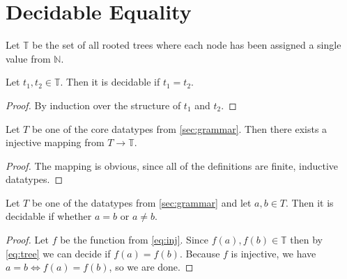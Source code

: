 \section{Decidable Equality}

\begin{definition}
  Let $\mathbb{T}$ be the set of all rooted trees where each node has been
  assigned a single value from $\mathbb{N}$.
\end{definition}

\begin{lemma}
  Let $t_1, t_2 \in \mathbb{T}$. Then it is decidable if $t_1 = t_2$.
\end{lemma}
\label{eq:tree}
\begin{proof}
  By induction over the structure of $t_1$ and $t_2$.
\end{proof}

\begin{lemma}
  Let $T$ be one of the core datatypes from \autoref{sec:grammar}. Then there
  exists a injective mapping from $T \to \mathbb{T}$.
\end{lemma}
\label{eq:inj}
\begin{proof}
  The mapping is obvious, since all of the definitions are finite, inductive
  datatypes.
\end{proof}

\begin{corollary}
  Let $T$ be one of the datatypes from \autoref{sec:grammar} and let
  $a, b \in T$. Then it is decidable if whether $a=b$ or $a \neq b$.
\end{corollary}
\label{dec:eq}
\begin{proof}
  Let $f$ be the function from \autoref{eq:inj}. Since
  $f(a), f(b) \in \mathbb{T}$ then by \autoref{eq:tree} we can decide if
  $f(a) = f(b)$. Because $f$ is injective, we have $a = b \iff f(a) = f(b)$, so
  we are done.
\end{proof}
